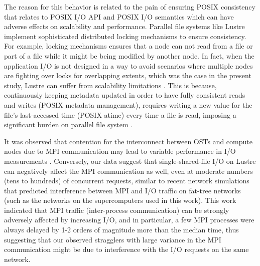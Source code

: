 The reason for this behavior is related to the pain of ensuring POSIX consistency that relates to POSIX I/O API and POSIX I/O semantics which can have adverse effects on scalability and performance.
Parallel file systems like Lustre implement sophisticated distributed locking mechanisms to ensure consistency.
For example, locking mechanisms ensures that a node can not read from a file or part of a file while it might be being modified by another node. 
In fact, when the application I/O is not designed in a way to avoid scenarios where multiple nodes are fighting over locks for overlapping extents, which was the case in the present study, Lustre can suffer from scalability limitations \cite{optimize_lustre}.
This is because, continuously keeping metadata updated in order to have fully consistent reads and writes (POSIX metadata management), requires writing a new value for the file's last-accessed time (POSIX atime) every time a file is read, imposing a significant burden on parallel file system \cite{POSIX2017}. 

It was observed that contention for the interconnect between OSTs and compute nodes due to MPI communication may lead to variable performance in I/O measurements \cite{Mache:2005aa}.
Conversely, our data suggest that single-shared-file I/O on Lustre can negatively affect the MPI communication as well, even at moderate numbers (tens to hundreds) of concurrent requests, similar to recent network simulations that predicted interference between MPI and I/O traffic on fat-tree networks \cite{Brown:2018ab} (such as the networks on the supercomputers used in this work).
This work indicated that MPI traffic (inter-process communication) can be strongly adversely affected by increasing I/O, and in particular, a few MPI processes were always delayed by 1-2 orders of magnitude more than the median time, thus suggesting that our observed stragglers with large variance in the MPI communication might be due to interference with the I/O requests on the same network.

